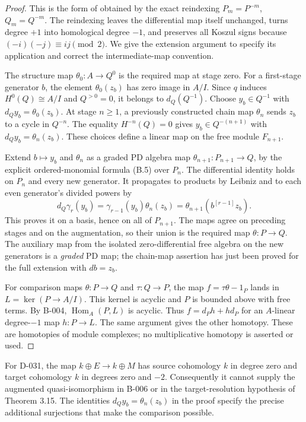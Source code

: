 \begin{proof}
This is the form of \cite[Lemma 23.6.11, Tag 09PP]{B_StacksTate}
obtained by the exact reindexing $P_m=P^{-m}$, $Q_m=Q^{-m}$.
The reindexing leaves the differential map itself unchanged,
turns degree $+1$ into homological degree $-1$, and preserves all
Koszul signs because $(-i)(-j)\equiv ij\pmod2$.
We give the extension argument to specify its application and correct
the intermediate-map convention.

The structure map $\theta_0:A\to Q^0$ is the required map at stage zero.
For a first-stage generator $b$, the element $\theta_0(z_b)$ has zero
image in $A/I$.  Since $q$ induces $H^0(Q)\cong A/I$ and $Q^{>0}=0$,
it belongs to $d_Q(Q^{-1})$.  Choose $y_b\in Q^{-1}$ with
$d_Qy_b=\theta_0(z_b)$.
At stage $n\geq1$, a previously constructed chain map $\theta_n$
sends $z_b$ to a cycle in $Q^{-n}$.  The equality $H^{-n}(Q)=0$
gives $y_b\in Q^{-(n+1)}$ with $d_Qy_b=\theta_n(z_b)$.
These choices define a linear map on the free module $F_{n+1}$.

Extend $b\mapsto y_b$ and $\theta_n$ as a graded PD algebra map
$\theta_{n+1}:P_{n+1}\to Q$, by the explicit ordered-monomial formula
\textup{(B.5)} over $P_n$.  The differential identity holds on $P_n$
and every new generator.  It propagates to products by Leibniz and to
each even generator's divided powers by
\[
d_Q\gamma_r(y_b)
=\gamma_{r-1}(y_b)\theta_n(z_b)
=\theta_{n+1}(b^{[r-1]}z_b).
\]
This proves it on a basis, hence on all of $P_{n+1}$.
The maps agree on preceding stages and on the augmentation, so their
union is the required map $\theta:P\to Q$.
The auxiliary map from the isolated zero-differential free algebra on
the new generators is a \emph{graded} PD map; the chain-map assertion
has just been proved for the full extension with $db=z_b$.

For comparison maps $\theta:P\to Q$ and $\tau:Q\to P$, the map
$f=\tau\theta-1_P$ lands in $L=\ker(P\to A/I)$.
This kernel is acyclic and $P$ is bounded above with free terms.
By B-004, $\operatorname{Hom}_A(P,L)$ is acyclic.
Thus $f=d_Ph+hd_P$ for an $A$-linear degree-$-1$ map $h:P\to L$.
The same argument gives the other homotopy.
These are homotopies of module complexes; no multiplicative homotopy
is asserted or used.
\end{proof}

For D-031, the map $k\oplus E\to k\oplus M$ has source cohomology
$k$ in degree zero and target cohomology $k$ in degrees zero and $-2$.
Consequently it cannot supply the augmented quasi-isomorphism in B-006
or in the target-resolution hypothesis of Theorem 3.15.
The identities $d_Qy_b=\theta_n(z_b)$ in the proof specify the precise
additional surjections that make the comparison possible.

